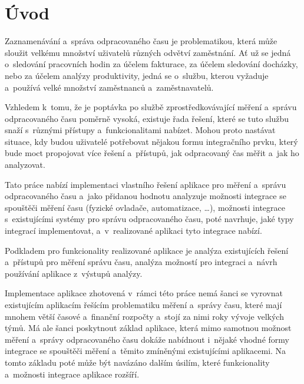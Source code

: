 
\graphicspath{ {./images} }

\chapter*{Úvod}
\setcounter{page}{1}

Zaznamenávání a~správa odpracovaného času je problematikou, která může sloužit velkému množství uživatelů různých odvětví zaměstnání. Ať už se jedná o~sledování pracovních hodin za účelem fakturace, za účelem sledování docházky, nebo za účelem analýzy produktivity, jedná se o~službu, kterou vyžaduje a~používá velké množství zaměstnanců a~zaměstnavatelů.

Vzhledem k~tomu, že je poptávka po službě zprostředkovávající měření a~správu odpracovaného času poměrně vysoká, existuje řada řešení, které se tuto službu snaží s~různými přístupy a~funkcionalitami nabízet. Mohou proto nastávat situace, kdy budou uživatelé potřebovat nějakou formu integračního prvku, který bude moct propojovat více řešení a~přístupů, jak odpracovaný čas měřit a~jak ho analyzovat. 

Tato práce nabízí implementaci vlastního řešení aplikace pro měření a~správu odpracovaného času a~jako přidanou hodnotu analyzuje možnosti integrace se spouštěči měření času (fyzické ovladače, automatizace, \dots), možnosti integrace s~existujícími systémy pro správu odpracovaného času, poté navrhuje, jaké typy integrací implementovat, a~v~realizované aplikaci tyto integrace nabízí.

Podkladem pro funkcionality realizované aplikace je analýza existujících řešení a~přístupů pro měření správu času, analýza možností pro integraci a~návrh používání aplikace z~výstupů analýzy.

Implementace aplikace zhotovená v~rámci této práce nemá šanci se vyrovnat existujícím aplikacím řešícím problematiku měření a~správy času, které mají mnohem větší časové a~finanční rozpočty a~stojí za nimi roky vývoje velkých týmů. Má ale šanci poskytnout základ aplikace, která mimo samotnou možnost měření a~správy odpracovaného času dokáže nabídnout i~nějaké vhodné formy integrace se spouštěči měření a~těmito zmíněnými existujícími aplikacemi. Na tomto základu poté může být navázáno dalším úsilím, které funkcionality a~možnosti integrace aplikace rozšíří. 

